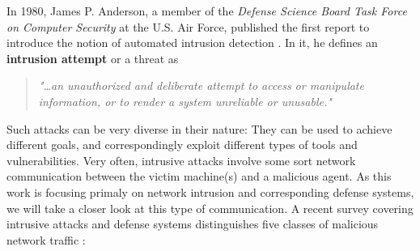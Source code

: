





In 1980, James P. Anderson, a member of the \textit{Defense Science Board Task Force on Computer Security} at the U.S. Air Force, published the first report to introduce the notion of automated intrusion detection \cite{anderson1980computer}. In it, he defines an \textbf{intrusion attempt} or a threat as 

\begin{quote}
\textit{"\dots an unauthorized and deliberate attempt to access or manipulate information, or to render a system unreliable or unusable."}
\end{quote}

Such attacks can be very diverse in their nature: They can be used to achieve different goals, and correspondingly exploit different types of tools and vulnerabilities. Very often, intrusive attacks involve some sort network communication between the victim machine(s) and a malicious agent. As this work is focusing primaly on network intrusion and corresponding defense systems, we will take a closer look at this type of communication. A recent survey covering intrusive attacks and defense systems distinguishes five classes of malicious network traffic \cite{nisioti2018intrusion}:

